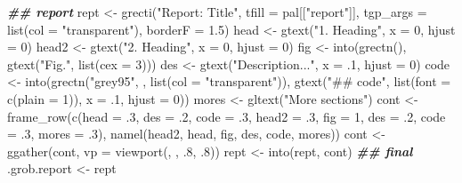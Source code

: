 \documentclass[
]{article}
\newenvironment{Shaded}{\begin{snugshade}}{\end{snugshade}}
\newcommand{\AttributeTok}[1]{\textcolor[rgb]{0.77,0.63,0.00}{#1}}
\newcommand{\DecValTok}[1]{\textcolor[rgb]{0.00,0.00,0.81}{#1}}
\newcommand{\DocumentationTok}[1]{\textcolor[rgb]{0.56,0.35,0.01}{\textbf{\textit{#1}}}}
\newcommand{\FloatTok}[1]{\textcolor[rgb]{0.00,0.00,0.81}{#1}}
\newcommand{\FunctionTok}[1]{\textcolor[rgb]{0.00,0.00,0.00}{#1}}
\newcommand{\NormalTok}[1]{#1}
\newcommand{\OtherTok}[1]{\textcolor[rgb]{0.56,0.35,0.01}{#1}}
\newcommand{\StringTok}[1]{\textcolor[rgb]{0.31,0.60,0.02}{#1}}
\begin{document}
\begin{Shaded}
\begin{Highlighting}[]
\DocumentationTok{\#\# report}
\NormalTok{rept }\OtherTok{\textless{}{-}} \FunctionTok{grecti}\NormalTok{(}\StringTok{"Report: Title"}\NormalTok{, }\AttributeTok{tfill =}\NormalTok{ pal[[}\StringTok{"report"}\NormalTok{]],}
               \AttributeTok{tgp\_args =} \FunctionTok{list}\NormalTok{(}\AttributeTok{col =} \StringTok{"transparent"}\NormalTok{), }\AttributeTok{borderF =} \FloatTok{1.5}\NormalTok{)}
\NormalTok{head }\OtherTok{\textless{}{-}} \FunctionTok{gtext}\NormalTok{(}\StringTok{"1. Heading"}\NormalTok{, }\AttributeTok{x =} \DecValTok{0}\NormalTok{, }\AttributeTok{hjust =} \DecValTok{0}\NormalTok{)}
\NormalTok{head2 }\OtherTok{\textless{}{-}} \FunctionTok{gtext}\NormalTok{(}\StringTok{"2. Heading"}\NormalTok{, }\AttributeTok{x =} \DecValTok{0}\NormalTok{, }\AttributeTok{hjust =} \DecValTok{0}\NormalTok{)}
\NormalTok{fig }\OtherTok{\textless{}{-}} \FunctionTok{into}\NormalTok{(}\FunctionTok{grectn}\NormalTok{(), }\FunctionTok{gtext}\NormalTok{(}\StringTok{"Fig."}\NormalTok{, }\FunctionTok{list}\NormalTok{(}\AttributeTok{cex =} \DecValTok{3}\NormalTok{)))}
\NormalTok{des }\OtherTok{\textless{}{-}} \FunctionTok{gtext}\NormalTok{(}\StringTok{"Description..."}\NormalTok{, }\AttributeTok{x =}\NormalTok{ .}\DecValTok{1}\NormalTok{, }\AttributeTok{hjust =} \DecValTok{0}\NormalTok{)}
\NormalTok{code }\OtherTok{\textless{}{-}} \FunctionTok{into}\NormalTok{(}\FunctionTok{grectn}\NormalTok{(}\StringTok{"grey95"}\NormalTok{, , }\FunctionTok{list}\NormalTok{(}\AttributeTok{col =} \StringTok{"transparent"}\NormalTok{)),}
             \FunctionTok{gtext}\NormalTok{(}\StringTok{"\#\# code"}\NormalTok{,}
                   \FunctionTok{list}\NormalTok{(}\AttributeTok{font =} \FunctionTok{c}\NormalTok{(}\AttributeTok{plain =} \DecValTok{1}\NormalTok{)), }\AttributeTok{x =}\NormalTok{ .}\DecValTok{1}\NormalTok{, }\AttributeTok{hjust =} \DecValTok{0}\NormalTok{))}
\NormalTok{mores }\OtherTok{\textless{}{-}} \FunctionTok{gltext}\NormalTok{(}\StringTok{"More sections"}\NormalTok{)}
\NormalTok{cont }\OtherTok{\textless{}{-}} \FunctionTok{frame\_row}\NormalTok{(}\FunctionTok{c}\NormalTok{(}\AttributeTok{head =}\NormalTok{ .}\DecValTok{3}\NormalTok{, }\AttributeTok{des =}\NormalTok{ .}\DecValTok{2}\NormalTok{, }\AttributeTok{code =}\NormalTok{ .}\DecValTok{3}\NormalTok{,}
                    \AttributeTok{head2 =}\NormalTok{ .}\DecValTok{3}\NormalTok{, }\AttributeTok{fig =} \DecValTok{1}\NormalTok{, }\AttributeTok{des =}\NormalTok{ .}\DecValTok{2}\NormalTok{, }\AttributeTok{code =}\NormalTok{ .}\DecValTok{3}\NormalTok{, }\AttributeTok{mores =}\NormalTok{ .}\DecValTok{3}\NormalTok{),}
                  \FunctionTok{namel}\NormalTok{(head2, head, fig, des, code, mores))}
\NormalTok{cont }\OtherTok{\textless{}{-}} \FunctionTok{ggather}\NormalTok{(cont, }\AttributeTok{vp =} \FunctionTok{viewport}\NormalTok{(, , .}\DecValTok{8}\NormalTok{, .}\DecValTok{8}\NormalTok{))}
\NormalTok{rept }\OtherTok{\textless{}{-}} \FunctionTok{into}\NormalTok{(rept, cont)}
\DocumentationTok{\#\# final}
\NormalTok{.grob.report }\OtherTok{\textless{}{-}}\NormalTok{ rept}
\end{Highlighting}
\end{Shaded}
\end{document}
